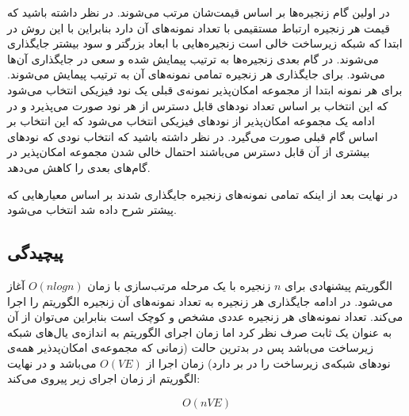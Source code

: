 در اولین گام زنجیره‌ها بر اساس قیمت‌شان مرتب می‌شوند.
در نظر داشته باشید که قیمت هر زنجیره ارتباط مستقیمی با تعداد نمونه‌های آن دارد
بنابراین با این روش در ابتدا که شبکه زیرساخت خالی است زنجیره‌هایی با ابعاد بزرگتر و سود بیشتر جایگذاری می‌شوند.
در گام بعدی زنجیره‌ها به ترتیب پیمایش  شده و سعی در جایگذاری آن‌ها می‌شود.
برای جایگذاری هر زنجیره تمامی نمونه‌های آن به ترتیب پیمایش می‌شوند.
برای هر نمونه ابتدا از مجموعه امکان‌پذیر نمونه‌ی قبلی یک نود فیزیکی انتخاب می‌شود که این انتخاب بر اساس تعداد نودهای قابل دسترس از هر نود صورت می‌پذیرد و
در ادامه یک مجموعه امکان‌پذیر از نودهای فیزیکی انتخاب می‌شود که این انتخاب بر اساس گام قبلی صورت می‌گیرد.
در نظر داشته باشید که انتخاب نودی که نودهای بیشتری از آن قابل دسترس می‌باشند احتمال خالی شدن مجموعه امکان‌پذیر در گام‌های بعدی را کاهش می‌دهد.

در نهایت بعد از اینکه تمامی نمونه‌های زنجیره جایگذاری شدند  بر اساس معیارهایی که پیشتر شرح داده شد انتخاب می‌شود.

\subsection{پیچیدگی}

الگوریتم پیشنهادی برای \(n\) زنجیره با یک مرحله مرتب‌سازی با زمان \(O(nlogn)\) آغاز می‌شود.
در ادامه جایگذاری هر زنجیره به تعداد نمونه‌های آن زنجیره الگوریتم  را اجرا می‌کند.
تعداد نمونه‌های هر زنجیره عددی مشخص و کوچک است بنابراین می‌توان از آن به عنوان یک ثابت صرف نظر کرد
اما زمان اجرای الگوریتم  به اندازه‌ی یال‌های شبکه زیرساخت می‌باشد
پس در بدترین حالت (زمانی که مجموعه‌ی امکان‌پدذیر همه‌ی نودهای شبکه‌ی زیرساخت را در بر دارد)‌ زمان اجرا از
\(O(VE)\)
می‌باشد و در نهایت الگوریتم از زمان اجرای زیر پیروی می‌کند:

$$
O(nVE)
$$